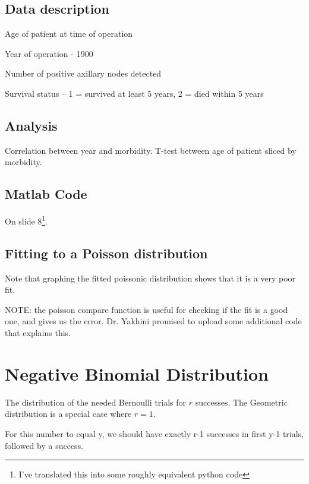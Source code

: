 \documentclass[a4paper]{article}
\newenvironment{enumerate*}%
  {\begin{enumerate}%
    \setlength{\itemsep}{0.5pt}%
    \setlength{\parsep}{0pt}%
    \setlength{\parskip}{0pt}}%
  {\end{enumerate}}
\begin{document}
\subsection{Data description}

\begin{enumerate*}
  \item Age of patient at time of operation
  \item Year of operation - 1900
  \item Number of positive axillary nodes detected
  \item Survival status -- 1 = survived at least 5 years, 2 = died within 5 years
\end{enumerate*}

\subsection{Analysis}
Correlation between year and morbidity. T-test between age of patient sliced by morbidity.

\subsection{Matlab Code}
On slide 8\footnote{I've translated this into some roughly equivalent python code}.



\subsection{Fitting to a Poisson distribution}


Note that graphing the fitted poissonic distribution shows that it is a very poor fit.

NOTE: the poisson compare function is useful for checking if the fit is a good one, and gives us the error. Dr. Yakhini promised to upload some additional code that explains this.

\section{Negative Binomial Distribution}
The distribution of the needed Bernoulli trials for $r$ successes. The Geometric distribution is a special case where $r=1$.

For this number to equal y, we should have exactly r-1 successes in first y-1 trials, followed by a success.
\end{document}
